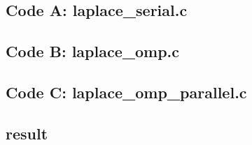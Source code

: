 \documentclass[11pt]{article}
\begin{document}
\subsection{Code A: laplace\_serial.c}


\begin{footnotesize}

\end{footnotesize}




\subsection{Code B: laplace\_omp.c}


\begin{footnotesize}

\end{footnotesize}




\subsection{Code C: laplace\_omp\_parallel.c}


\begin{footnotesize}

\end{footnotesize}



\subsection{result}
\begin{footnotesize}
 
\end{footnotesize}
\end{document}
